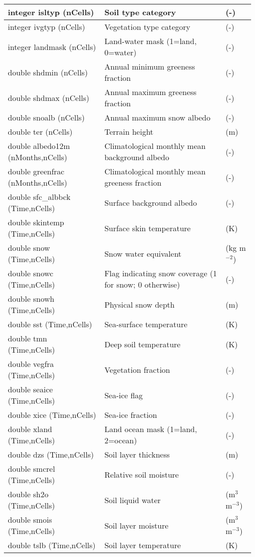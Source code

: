 {\small
\begin{longtable}{|p{2.0in} |p{3.0in} |p{1.0in} |}
\hline
integer isltyp (nCells) & Soil type category & (-) \\ \hline
integer ivgtyp (nCells) & Vegetation type category & (-) \\ \hline
integer landmask (nCells) & Land-water mask (1=land, 0=water) & (-) \\ \hline
double shdmin  (nCells) & Annual minimum greeness fraction & (-) \\ \hline
double shdmax (nCells) & Annual maximum greeness fraction & (-) \\ \hline
double snoalb (nCells) & Annual maximum snow albedo & (-) \\ \hline
double ter (nCells) & Terrain height & (m) \\ \hline
double albedo12m \hfill\break (nMonths,nCells) & Climatological monthly mean background albedo& (-) \\ \hline
double greenfrac \hfill\break (nMonths,nCells) & Climatological monthly mean greeness fraction & (-) \\ \hline
double sfc\_albbck (Time,nCells) & Surface background albedo& (-) \\ \hline
double skintemp (Time,nCells) & Surface skin temperature & (K) \\ \hline
double snow (Time,nCells) & Snow water equivalent & (kg m$^{-2}$) \\ \hline
double snowc (Time,nCells) & Flag indicating snow coverage (1 for snow; 0 otherwise) & (-) \\ \hline
double snowh (Time,nCells) & Physical snow depth & (m) \\ \hline
double sst (Time,nCells) & Sea-surface temperature & (K) \\ \hline
double tmn (Time,nCells) & Deep soil temperature & (K) \\ \hline
double vegfra (Time,nCells) & Vegetation fraction & (-) \\ \hline
double seaice (Time,nCells) & Sea-ice flag & (-) \\ \hline
double xice (Time,nCells) & Sea-ice fraction & (-) \\ \hline
double xland (Time,nCells) & Land ocean mask (1=land, 2=ocean) & (-) \\ \hline
double dzs (Time,nCells) & Soil layer thickness & (m) \\ \hline
double smcrel (Time,nCells) & Relative soil moisture & (-) \\ \hline
double sh2o (Time,nCells) & Soil liquid water & (m$^{3}$ m$^{-3}$) \\ \hline
double smois (Time,nCells) & Soil layer moisture & (m$^{3}$ m$^{-3}$) \\ \hline
double tslb (Time,nCells) & Soil layer temperature & (K) \\ \hline
\end{longtable}
}


